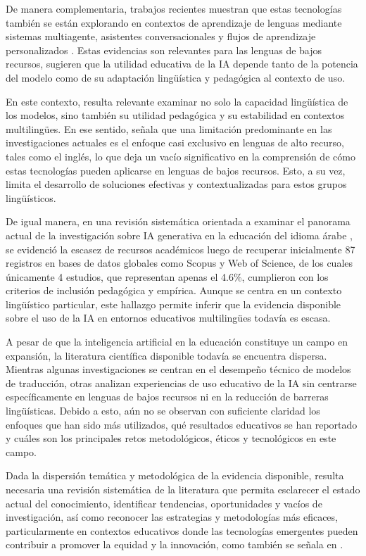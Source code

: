 De manera complementaria, trabajos recientes muestran que estas tecnologías también se están explorando en contextos de aprendizaje de lenguas mediante sistemas multiagente, asistentes conversacionales y flujos de aprendizaje personalizados \cite{Nouzri2025,Tebourbi2025}. Estas evidencias son relevantes para las lenguas de bajos recursos, sugieren que la utilidad educativa de la IA depende tanto de la potencia del modelo como de su adaptación lingüística y pedagógica al contexto de uso.


En este contexto, resulta relevante examinar no solo la capacidad lingüística de los modelos, sino también su utilidad pedagógica y su estabilidad en contextos multilingües. En ese sentido, \cite{Onan2026} señala que una limitación predominante en las investigaciones actuales es el enfoque casi exclusivo en lenguas de alto recurso, tales como el inglés, lo que deja un vacío significativo en la comprensión de cómo estas tecnologías pueden aplicarse en lenguas de bajos recursos. Esto, a su vez, limita el desarrollo de soluciones efectivas y contextualizadas para estos grupos lingüísticos.


De igual manera, en una revisión sistemática orientada a examinar el panorama actual de la investigación sobre IA generativa en la educación del idioma árabe \cite{Moustafa2026}, se evidenció la escasez de recursos académicos luego de recuperar inicialmente 87 registros en bases de datos globales como Scopus y Web of Science, de los cuales únicamente 4 estudios, que representan apenas el 4.6\%, cumplieron con los criterios de inclusión pedagógica y empírica. Aunque se centra en un contexto lingüístico particular, este hallazgo permite inferir que la evidencia disponible sobre el uso de la IA en entornos educativos multilingües todavía es escasa.


A pesar de que la inteligencia artificial en la educación constituye un campo en expansión, la literatura científica disponible todavía se encuentra dispersa. Mientras algunas investigaciones se centran en el desempeño técnico de modelos de traducción, otras analizan experiencias de uso educativo de la IA sin centrarse específicamente en lenguas de bajos recursos ni en la reducción de barreras lingüísticas. Debido a esto, aún no se observan con suficiente claridad los enfoques que han sido más utilizados, qué resultados educativos se han reportado y cuáles son los principales retos metodológicos, éticos y tecnológicos en este campo. 


Dada la dispersión temática y metodológica de la evidencia disponible, resulta necesaria una revisión sistemática de la literatura que permita esclarecer el estado actual del conocimiento, identificar tendencias, oportunidades y vacíos de investigación, así como reconocer las estrategias y metodologías más eficaces, particularmente en contextos educativos donde las tecnologías emergentes pueden contribuir a promover la equidad y la innovación, como también se señala en \cite{Yoshida2025}.


